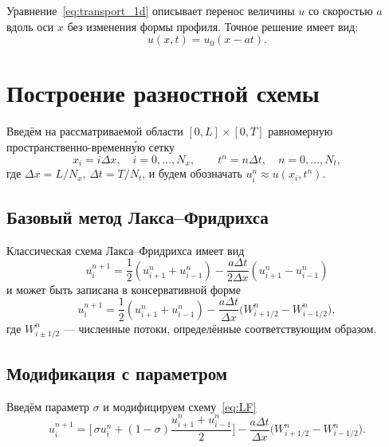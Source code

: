 \documentclass[12pt]{article}
\begin{document}
Уравнение~\eqref{eq:transport_1d} описывает перенос величины $u$ со скоростью $a$ вдоль оси $x$ без изменения формы профиля. Точное решение имеет вид:
\begin{equation}
u(x,t) = u_0(x - at).
\label{eq:exact_solution}
\end{equation}

\section{Построение разностной схемы}
\label{sec:scheme}

Введём на рассматриваемой области $[0,L]\times[0,T]$ равномерную пространственно-временн\'{у}ю сетку
\begin{equation}
x_i = i\Delta x,\quad i=0,\dots,N_x,\qquad 
t^n = n\Delta t,\quad n=0,\dots,N_t,
\end{equation}
где $\Delta x = L/N_x$, $\Delta t = T/N_t$, и будем обозначать $u_i^n \approx u(x_i,t^n)$.

\subsection{Базовый метод Лакса–Фридрихса}
Классическая схема Лакса–Фридрихса имеет вид
\begin{equation}
u_i^{n+1} = \frac{1}{2}(u_{i+1}^n + u_{i-1}^n) 
            - \frac{a\Delta t}{2\Delta x}(u_{i+1}^n - u_{i-1}^n)
\label{eq:lax-friedrichs}
\end{equation}
и может быть записана в консервативной форме
\begin{equation}
u_i^{n+1} = \frac{1}{2}(u_{i+1}^n + u_{i-1}^n) 
            - \frac{a\Delta t}{\Delta x}\bigl(W^n_{i+1/2} - W^n_{i-1/2}\bigr),
\label{eq:lax-friedrichs-conservative}
\end{equation}
где $W^n_{i\pm1/2}$ — численные потоки, определённые соответствующим образом.

\subsection{Модификация с параметром}
Введём параметр $\sigma$ и модифицируем схему~\eqref{eq:LF}
\begin{equation}
u_i^{n+1} = \biggl[\,\sigma u_i^n 
            + (1-\sigma)\frac{u_{i+1}^n + u_{i-1}^n}{2}\biggr]
            - \frac{a\Delta t}{\Delta x}\bigl(W^n_{i+1/2} - W^n_{i-1/2}\bigr).
\label{eq:modified-conservative}
\end{equation}
\end{document}
